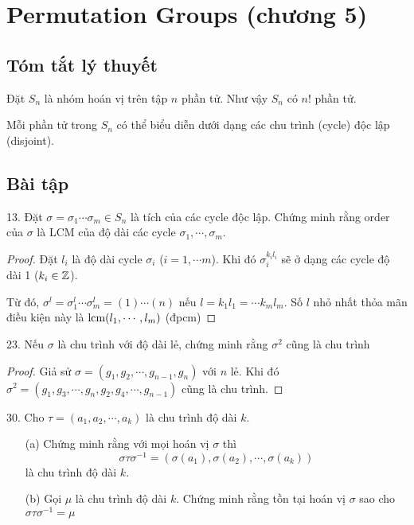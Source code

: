 \section{Permutation Groups (chương 5)}

\subsection{Tóm tắt lý thuyết}

Đặt $S_n$ là nhóm hoán vị trên tập $n$ phần tử. Như vậy $S_n$ có $n!$ phần tử.

Mỗi phần tử trong $S_n$ có thể biểu diễn dưới dạng các chu trình (cycle) độc lập (disjoint).

\subsection{Bài tập}

13. Đặt $\sigma = \sigma_1 \cdots \sigma_m \in S_n$ là tích của các cycle độc lập. Chứng minh rằng order của $\sigma$ là LCM của độ dài các cycle $\sigma_1, \cdots, \sigma_m$.

\begin{proof}
    Đặt $l_i$ là độ dài cycle $\sigma_i$ ($i = 1, \cdots m$). Khi đó $\sigma_i^{k_i l_i}$ sẽ ở dạng các cycle độ dài 1 ($k_i \in \mathbb{Z}$).

    Từ đó, $\sigma^l = \sigma_1^l \cdots \sigma_m^l = (1)\cdots(n)$ nếu $l = k_1 l_1 = \cdots k_m l_m$. Số $l$ nhỏ nhất thỏa mãn điều kiện này là $\text{lcm}(l_1, \cdots, l_m)$ (đpcm)

\end{proof}

23. Nếu $\sigma$ là chu trình với độ dài lẻ, chứng minh rằng $\sigma^2$ cũng là chu trình
\begin{proof}
    Giả sử $\sigma = (g_1, g_2, \cdots, g_{n-1}, g_n)$ với $n$ lẻ. Khi đó $\sigma^2 = (g_1, g_3, \cdots, g_n, g_2, g_4, \cdots, g_{n-1})$ cũng là chu trình.
\end{proof}

30. Cho $\tau = (a_1, a_2, \cdots, a_k)$ là chu trình độ dài $k$.

\begin{enumerate}
    \item[(a)] Chứng minh rằng với mọi hoán vị $\sigma$ thì $$\sigma \tau \sigma^{-1} = (\sigma(a_1), \sigma(a_2), \cdots, \sigma(a_k))$$ là chu trình độ dài $k$.
    \item[(b)] Gọi $\mu$ là chu trình độ dài $k$. Chứng minh rằng tồn tại hoán vị $\sigma$ sao cho $\sigma \tau \sigma^{-1} = \mu$
\end{enumerate}

